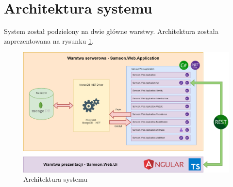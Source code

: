\documentclass[a4paper,twoside,12pt]{book}
\begin{document}
\section{Architektura systemu}
System został podzielony na dwie główne warstwy. Architektura została zaprezentowana na rysunku \ref{fig:architektura}.
\begin{figure}[htbp]
	\centering
	\includegraphics[width=1\linewidth]{../diagramy/architektura}
	\caption{Architektura systemu}
	\label{fig:architektura}
\end{figure}
\end{document}
